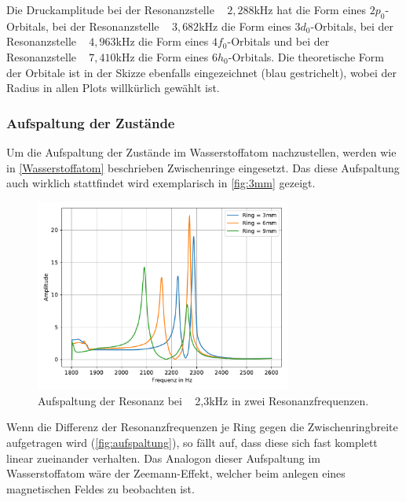 Die Druckamplitude bei der Resonanzstelle ~ $2,288$kHz hat die Form eines $2{p}_0$-Orbitals, bei der Resonanzstelle ~ $3,682$kHz die Form eines $3{d}_0$-Orbitals,
bei der Resonanzstelle ~ $4,963$kHz die Form eines $4{f}_0$-Orbitals und bei der Resonanzstelle ~ $7,410$kHz die Form eines $6{h}_0$-Orbitals. Die theoretische Form
der Orbitale ist in der Skizze ebenfalls eingezeichnet (blau gestrichelt), wobei der Radius in allen Plots willkürlich gewählt ist.


\subsubsection{Aufspaltung der Zustände}
Um die Aufspaltung der Zustände im Wasserstoffatom nachzustellen, werden wie in \autoref{Wasserstoffatom} beschrieben Zwischenringe eingesetzt. Das diese Aufspaltung 
auch wirklich stattfindet wird exemplarisch in \autoref{fig:3mm} gezeigt.

\begin{figure}
    \centering
    \includegraphics[width=0.75\textwidth]{pic/3mm.pdf}
    \caption{Aufspaltung der Resonanz bei ~ 2,3kHz in zwei Resonanzfrequenzen.}
    \label{fig:3mm}
  \end{figure}

  \noindent
  Wenn die Differenz der Resonanzfrequenzen je Ring gegen die Zwischenringbreite aufgetragen wird (\autoref{fig:aufspaltung}), so fällt auf, dass diese sich fast komplett linear zueinander verhalten.
  Das Analogon dieser Aufspaltung im Wasserstoffatom wäre der Zeemann-Effekt, welcher beim anlegen eines magnetischen Feldes zu beobachten ist.

